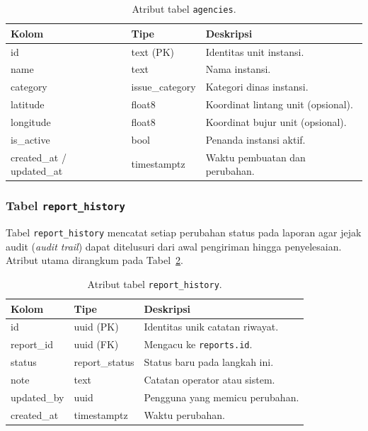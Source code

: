 \begin{table}[htbp]
\centering
\caption{Atribut tabel \texttt{agencies}.}
\label{tab:agencies}
\small
\begin{tabular}{p{3.4cm} p{2.6cm} p{6.5cm}}
\toprule
\textbf{Kolom} & \textbf{Tipe} & \textbf{Deskripsi} \\
\midrule
id & text (PK) & Identitas unit instansi. \\
name & text & Nama instansi. \\
category & issue\_category & Kategori dinas instansi. \\
latitude & float8 & Koordinat lintang unit (opsional). \\
longitude & float8 & Koordinat bujur unit (opsional). \\
is\_active & bool & Penanda instansi aktif. \\
created\_at / updated\_at & timestamptz & Waktu pembuatan dan perubahan. \\
\bottomrule
\end{tabular}
\end{table}

\subsubsection{Tabel \texttt{report\_history}}

Tabel \texttt{report\_history} mencatat setiap perubahan status pada laporan agar jejak audit (\textit{audit trail}) dapat ditelusuri dari awal pengiriman hingga penyelesaian. Atribut utama dirangkum pada Tabel~\ref{tab:report-history}.

\begin{table}[htbp]
\centering
\caption{Atribut tabel \texttt{report\_history}.}
\label{tab:report-history}
\small
\begin{tabular}{p{3.4cm} p{2.6cm} p{6.5cm}}
\toprule
\textbf{Kolom} & \textbf{Tipe} & \textbf{Deskripsi} \\
\midrule
id & uuid (PK) & Identitas unik catatan riwayat. \\
report\_id & uuid (FK) & Mengacu ke \texttt{reports.id}. \\
status & report\_status & Status baru pada langkah ini. \\
note & text & Catatan operator atau sistem. \\
updated\_by & uuid & Pengguna yang memicu perubahan. \\
created\_at & timestamptz & Waktu perubahan. \\
\bottomrule
\end{tabular}
\end{table}

